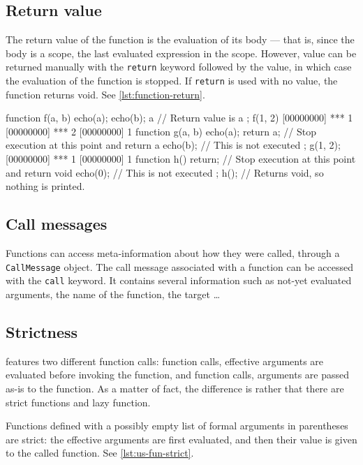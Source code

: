 \subsection{Return value}

The return value of the function is the evaluation of its body --- that
is, since the body is a scope, the last evaluated expression in the
scope. However, value can be returned manually with the
\lstinline|return| keyword followed by the value, in which case the
evaluation of the function is stopped. If \lstinline|return| is used
with no value, the function returns void. See \autoref{lst:function-return}.

\begin{urbiscript}[caption=Returning values from functions,
  label=lst:function-return,float=\floatpos]
function f(a, b)
{
  echo(a);
  echo(b);
  a // Return value is a
};
f(1, 2)
[00000000] *** 1
[00000000] *** 2
[00000000] 1
function g(a, b)
{
  echo(a);
  return a; // Stop execution at this point and return a
  echo(b); // This is not executed
};
g(1, 2);
[00000000] *** 1
[00000000] 1
function h()
{
  return; // Stop execution at this point and return void
  echo(0); // This is not executed
};
h(); // Returns void, so nothing is printed.
\end{urbiscript}

\subsection{Call messages}
\label{sec:us-fun-callmsg}

Functions can access meta-information about how they were called,
through a \lstinline|CallMessage| object. The call message associated
with a function can be accessed with the \lstinline|call| keyword. It
contains several information such as not-yet evaluated arguments, the
name of the function, the target \ldots

\subsection{Strictness}

\us features two different function calls:  function
calls, effective arguments are evaluated before invoking the function,
and  function calls, arguments are passed as-is to the
function.  As a matter of fact, the difference is rather that there
are strict functions and lazy function.

Functions defined with a possibly empty list of formal arguments in
parentheses are strict: the effective arguments are first evaluated,
and then their value is given to the called function.  See
\autoref{lst:us-fun-strict}.

